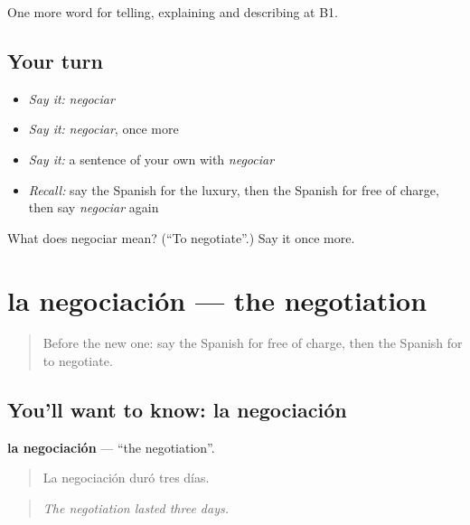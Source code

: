 \begin{grammarlens}[title={What you've built}]
One more word for telling, explaining and describing at B1.
\end{grammarlens}

\subsection*{Your turn}
\begin{itemize}
\raggedright
  \item \emph{Say it:} \emph{negociar}
  \item \emph{Say it:} \emph{negociar}, once more
  \item \emph{Say it:} a sentence of your own with \emph{negociar}
  \item \emph{Recall:} say the Spanish for the luxury, then the Spanish for free of charge, then say \emph{negociar} again
\end{itemize}

\begin{tcolorbox}[breakable,colback=teal!4,colframe=teal!35!black,title={Before you move on}]
What does negociar mean? (\textquotedblleft{}To negotiate\textquotedblright{}.) Say it once more.
\end{tcolorbox}
\section[la negociación]{la negociación — the negotiation}

\label{lesson:ES-C634-negociacion}



\begin{quote}
Before the new one: say the Spanish for free of charge, then the Spanish for to negotiate.
\end{quote}

\subsection*{You'll want to know: la negociación}
\textbf{la negociación} — \textquotedblleft{}the negotiation\textquotedblright{}.

\begin{quote}
La negociación duró tres días.
\end{quote}

\begin{quote}
\emph{The negotiation lasted three days.}
\end{quote}

